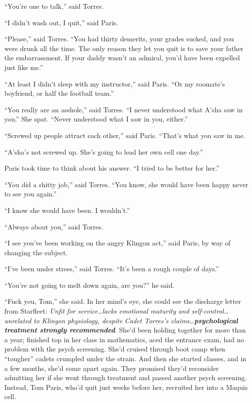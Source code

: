 \documentclass[twoside,letterpaper,12pt]{memoir}
\begin{document}
``You're one to talk,'' said Torres.

``I didn't wash out, I quit,'' said Paris.

``Please,'' said Torres. ``You had thirty demerits, your grades sucked, and you were drunk all the time. The only reason they let you quit is to save your father the embarrassment. If your daddy wasn't an admiral, you'd have been expelled just like me.''

``At least I didn't sleep with my instructor,'' said Paris. ``Or my roomate’s boyfriend, or half the football team.''

``You really are an asshole,'' said Torres. ``I never understood what A'sha saw in you.'' She spat. ``Never understood what I saw in you, either.''

``Screwed up people attract each other,'' said Paris. ``That's what you saw in me.

``A'sha's not screwed up. She's going to lead her own cell one day.''

Paris took time to think about his answer. ``I tried to be better for her.''

``You did a shitty job,'' said Torres. ``You know, she would have been happy never to see you again.''

``I know she would have been. I wouldn't.''

``Always about you,'' said Torres.

``I see you've been working on the angry Klingon act,'' said Paris, by way of changing the subject.

``I've been under stress,'' said Torres. ``It's been a rough couple of days.''

``You're not going to melt down again, are you?'' he said.

``Fuck you, Tom,'' she said. In her mind's eye, she could see the discharge letter from Starfleet: \textit{Unfit for service\ldots lacks emotional maturity and self-control\ldots unrelated to Klingon physiology, despite Cadet Torres's claims\ldots \textbf{psychological treatment strongly recommended}}. She'd been holding together for more than a year; finished top in her class in mathematics, aced the entrance exam, had no problem with the psych screening. She'd cruised through boot camp when ``tougher'' cadets crumpled under the strain. And then she started classes, and in a few months, she'd come apart again. They promised they'd reconsider admitting her if she went through treatment and passed another psych screening. Instead, Tom Paris, who'd quit just weeks before her, recruited her into a Maquis cell.
\end{document}
